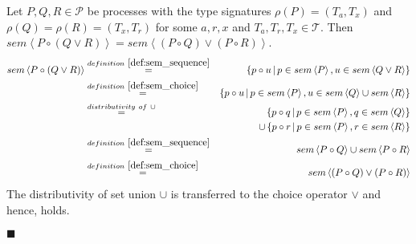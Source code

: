 \begin{myproof}
Let $P, Q, R \in \mathcal{P}$ be processes with the type signatures $\rho \left( P \right) = \left( T_a, T_x \right)$ and $\rho \left( Q \right) = \rho \left( R \right) = \left( T_x, T_r \right)$ for some $a, r, x$ and $T_a, T_r, T_x \in \mathcal{T}$. Then $sem \left\langle P \circ \left( Q \vee R \right) \right\rangle = sem \left\langle \left( P \circ Q \right) \vee \left( P \circ R \right) \right\rangle$.
\begin{eqnarray*}
  sem \left\langle P \circ \left( Q \vee R \right) \right\rangle & \overset{\defref{def:sem_sequence}}{=} & \left\{ p \circ u \,|\, p \in sem \left\langle P \right\rangle, u \in sem \left\langle Q \vee R \right\rangle \right\} \\
  & \overset{\defref{def:sem_choice}}{=} & \left\{ p \circ u \,|\, p \in sem \left\langle P \right\rangle, u \in sem \left\langle Q \right\rangle \cup sem \left\langle R \right\rangle \right\} \\
  & \overset{distributivity \ of \ \cup}{=} & \hspace*{0.8em} \left\{ p \circ q \,|\, p \in sem \left\langle P \right\rangle, q \in sem \left\langle Q \right\rangle \right\} \\
  & & \cup \left\{ p \circ r \,|\, p \in sem \left\langle P \right\rangle, r \in sem \left\langle R \right\rangle \right\} \\
  & \overset{\defref{def:sem_sequence}}{=} & sem \left\langle P \circ Q \right\rangle \cup sem \left\langle P \circ R \right\rangle \\
  & \overset{\defref{def:sem_choice}}{=} & sem \left\langle \left( P \circ Q \right) \vee \left( P \circ R \right) \right\rangle
\end{eqnarray*}
The distributivity of set union $\cup$ is transferred to the choice operator $\vee$ and hence,  holds.

\hfill$\blacksquare$
\end{myproof}

\begin{myproof}
\end{myproof}

\begin{myproof}
\end{myproof}

\begin{myproof}
\end{myproof}

